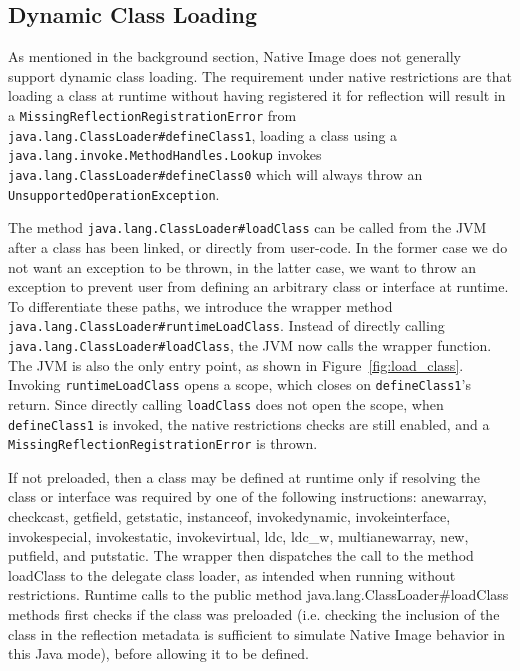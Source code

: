\subsection{Dynamic Class Loading}
As mentioned in the background section, Native Image does not generally support dynamic class loading. The requirement under native restrictions are that loading a class at runtime without having registered it for reflection will result in a \verb|MissingReflectionRegistrationError| from \verb|java.lang.ClassLoader#defineClass1|, loading a class using a \verb|java.lang.invoke.MethodHandles.Lookup| invokes \verb|java.lang.ClassLoader#defineClass0| which will always throw an \verb|UnsupportedOperationException|.

The method \verb|java.lang.ClassLoader#loadClass| can be called from the JVM after a class has been linked, or directly from user-code. In the former case we do not want an exception to be thrown, in the latter case, we want to throw an exception to prevent user from defining an arbitrary class or interface at runtime.
To differentiate these paths, we introduce the wrapper method \verb|java.lang.ClassLoader#runtimeLoadClass|. Instead of directly calling \verb|java.lang.ClassLoader#loadClass|, the JVM now calls the wrapper function. The JVM is also the only entry point, as shown in Figure~\ref{fig:load_class}.
Invoking \verb|runtimeLoadClass| opens a scope, which closes on \verb|defineClass1|'s return.
Since directly calling \verb|loadClass| does not open the scope, when \verb|defineClass1| is invoked, the native restrictions checks are still enabled, and a 
\verb|MissingReflectionRegistrationError| is thrown.

If not preloaded, then a class may be defined at runtime only if resolving the class or interface was required by one of the following instructions:
anewarray, checkcast, getfield, getstatic, instanceof, invokedynamic, invokeinterface, invokespecial,
invokestatic, invokevirtual, ldc, ldc\_w, multianewarray, new, putfield, and putstatic.
The wrapper then dispatches the call to the method loadClass to the delegate class loader, as intended when running without restrictions.
Runtime calls to the public method java.lang.ClassLoader#loadClass methods first checks if the class was preloaded (i.e. checking the inclusion of the class in the reflection metadata is sufficient to simulate Native Image behavior in this Java mode), before allowing it to be defined.

